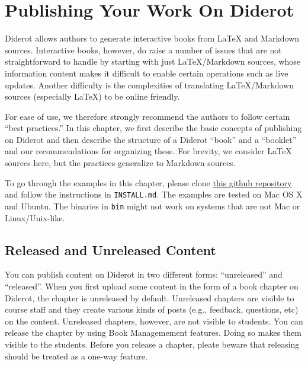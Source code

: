 \chapter{Publishing Your Work On Diderot}
\label{ch:publish}

\begin{gram}
Diderot allows authors to generate interactive books from LaTeX and Markdown sources.
%
Interactive books, however, do raise a number of issues that are not straightforward to handle by starting with just LaTeX/Markdown sources, whose information content makes it difficult to enable certain operations such as live updates.
%
Another difficulty is the complexities of translating LaTeX/Markdown sources (especially LaTeX) to be online friendly.

%
For ease of use, we therefore strongly recommend the authors to follow certain ``best practices.''
%
In this chapter, we first describe the basic concepts of publishing on
Diderot and then describe the structure of a Diderot ``book'' and a ``booklet'' and our recommendations for organizing these.
%
For brevity, we consider LaTeX sources here, but the practices generalize to Markdown sources.
\end{gram}

\begin{important}[Sources]
To go through the examples in this chapter, please clone 
%
\href{https://github.com/diderot-edu/diderot-guide}{this github repository}
%
and follow the instructions in \lstinline`INSTALL.md`. 
%
The examples are tested on Mac OS X and Ubuntu.  The binaries in \lstinline`bin` might not work on systems that are not Mac or Linux/Unix-like. 
\end{important}

\section{Released and Unreleased Content}
\label{sec:publish::released-unreleased}

You can publish content on Diderot in two different forms: ``unreleased'' and ``released''.
%
When you first upload some content in the form of a book chapter on Diderot, the chapter is unreleased by default.
%
Unreleased chapters are visible to course staff and they create various kinds of posts (e.g., feedback, questions, etc) on the content.
%
Unreleased chapters, however, are not visible to students.
%
You can release the chapter by using Book Managemement features. 
%
Doing so makes them visible to the students.
%
Before you release a chapter, pleate  beware that releasing should be treated as a one-way feature.
%


